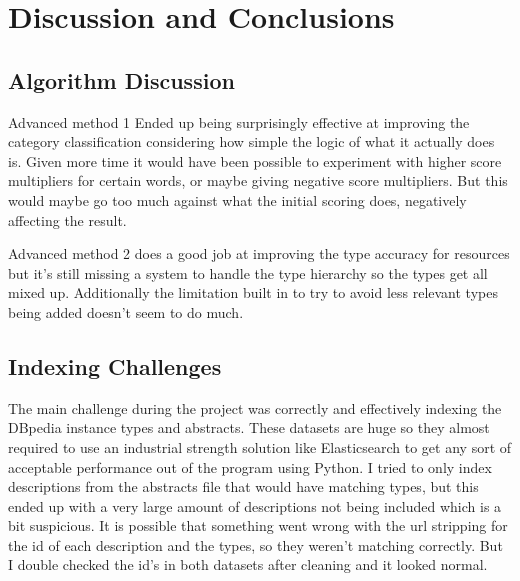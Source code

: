 \documentclass[sigconf]{acmart}
\begin{document}
\section{Discussion and Conclusions}
\subsection{Algorithm Discussion}
Advanced method 1 Ended up being surprisingly effective at improving the category classification considering how simple the logic of what it actually does is. Given more time it would have been possible to experiment with higher score multipliers for certain words, or maybe giving negative score multipliers. But this would maybe go too much against what the initial scoring does, negatively affecting the result. 

Advanced method 2 does a good job at improving the type accuracy for resources but it's still missing a system to handle the type hierarchy so the types get all mixed up. Additionally the limitation built in to try to avoid less relevant types being added doesn't seem to do much. 

\subsection{Indexing Challenges}
The main challenge during the project was correctly and effectively indexing the DBpedia instance types and abstracts. These datasets are huge so they almost required to use an industrial strength solution like Elasticsearch to get any sort of acceptable performance out of the program using Python. I tried to only index descriptions from the abstracts file that would have matching types, but this ended up with a very large amount of descriptions not being included which is a bit suspicious. It is possible that something went wrong with the url stripping for the id of each description and the types, so they weren't matching correctly. But I double checked the id's in both datasets after cleaning and it looked normal. 


\end{document}

